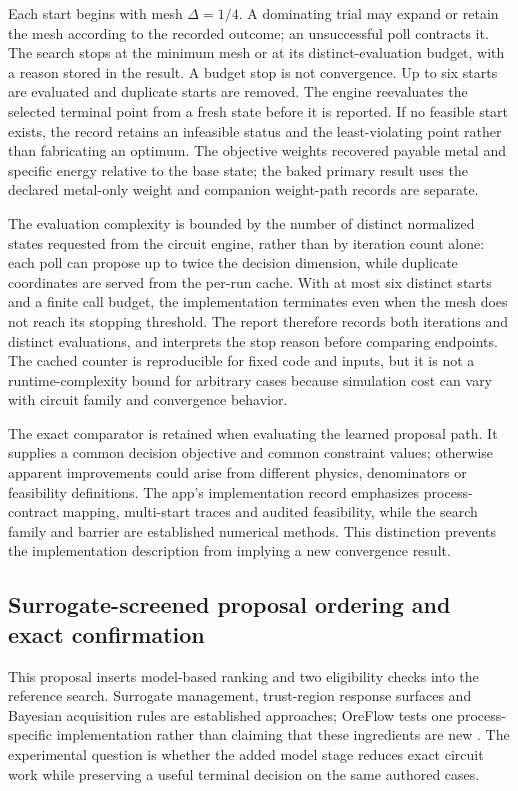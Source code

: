 \documentclass[10pt]{article}
\begin{document}
Each start begins with mesh \(\Delta=1/4\). A dominating trial may
expand or retain the mesh according to the recorded outcome; an
unsuccessful poll contracts it. The search stops at the minimum mesh or
at its distinct-evaluation budget, with a reason stored in the result. A
budget stop is not convergence. Up to six starts are evaluated and
duplicate starts are removed. The engine reevaluates the selected
terminal point from a fresh state before it is reported. If no feasible
start exists, the record retains an infeasible status and the
least-violating point rather than fabricating an optimum. The objective
weights recovered payable metal and specific energy relative to the base
state; the baked primary result uses the declared metal-only weight and
companion weight-path records are separate.

The evaluation complexity is bounded by the number of distinct normalized
states requested from the circuit engine, rather than by iteration count
alone: each poll can propose up to twice the decision dimension, while
duplicate coordinates are served from the per-run cache. With at most six
distinct starts and a finite call budget, the implementation terminates
even when the mesh does not reach its stopping threshold. The report
therefore records both iterations and distinct evaluations, and interprets
the stop reason before comparing endpoints. The cached counter is
reproducible for fixed code and inputs, but it is not a runtime-complexity
bound for arbitrary cases because simulation cost can vary with circuit
family and convergence behavior.

The exact comparator is retained when evaluating the learned proposal
path. It supplies a common decision objective and common constraint values;
otherwise apparent improvements could arise from different physics,
denominators or feasibility definitions. The app's implementation record
emphasizes process-contract mapping, multi-start traces and audited
feasibility, while the search family and barrier are established numerical
methods. This distinction prevents the implementation description from
implying a new convergence result.

\subsection{Surrogate-screened proposal ordering and exact confirmation}
\label{method-screened-search}

This proposal inserts model-based ranking and two eligibility checks into
the reference search. Surrogate management, trust-region response
surfaces and Bayesian acquisition rules are established approaches;
OreFlow tests one process-specific implementation rather than claiming
that these ingredients are new \cite{booker1999,forresterkeane2009,
jones1998,shahriari2016}. The experimental question is whether the added
model stage reduces exact circuit work while preserving a useful terminal
decision on the same authored cases.
\end{document}
